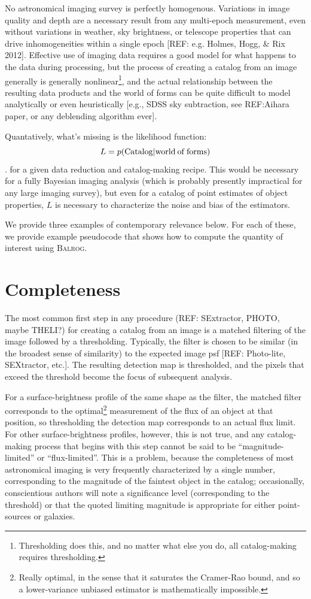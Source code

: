 \documentclass[12pt]{book}
\newcommand{\balrog}{\textsc{Balrog}}
\begin{document}
No astronomical imaging survey is perfectly homogenous. Variations in
image quality and depth are a necessary result from any multi-epoch
measurement, even without variations in weather, sky brightness, or
telescope properties that can drive inhomogeneities within a single
epoch [REF: e.g. Holmes, Hogg, \& Rix 2012]. Effective use of imaging
data requires a good model for what happens to the data during
processing, but the process of creating a catalog from an image
generally is generally nonlinear\footnote{Thresholding does this, and
  no matter what else you do, all catalog-making requires
  thresholding.}, and the actual relationship between the resulting
data products and the world of forms can be quite difficult to model
analytically or even heuristically [e.g., SDSS sky subtraction, see
REF:Aihara paper, or any deblending algorithm ever].

Quantatively, what's missing is the likelihood function:
\begin{equation}
L = p( {\rm Catalog} | {\rm world\: of\: forms})
\end{equation}.
for a given data reduction and catalog-making recipe. This would be
necessary for a fully Bayesian imaging analysis (which is probably presently impractical
for any large imaging survey), but even for a catalog of
point estimates of object properties, $L$ is necessary to characterize
the noise and bias of the estimators.

We provide three examples of contemporary relevance below. For each of
these, we provide example pseudocode that shows how to compute the
quantity of interest using \balrog{}.

\section{Completeness}
The most common first step in any procedure (REF: SExtractor, PHOTO, maybe THELI?) for
creating a catalog from an image is a matched filtering of the image
followed by a thresholding. Typically, the filter is chosen to be
similar (in the broadest sense of similarity) to the expected image
psf [REF: Photo-lite, SEXtractor, etc.]. The resulting detection map
is thresholded, and the pixels that exceed the threshold become the
focus of subsequent analysis.

For a surface-brightness profile of the same shape as the filter, the
matched filter corresponds to the optimal\footnote{Really optimal, in
  the sense that it saturates the Cramer-Rao bound, and so a
  lower-variance unbiased estimator is mathematically impossible.}
measurement of the flux of an object at that position, so thresholding
the detection map corresponds to an actual flux limit. For other
surface-brightness profiles, however, this is not true, and any
catalog-making process that begins with this step cannot be said to be
``magnitude-limited'' or ``flux-limited''. This is a problem, because
the completeness of most astronomical imaging is very frequently
characterized by a single number, corresponding to the magnitude of
the faintest object in the catalog; occasionally, conscientious
authors will note a significance level (corresponding to the
threshold) or that the quoted limiting magnitude is appropriate
for either point-sources or galaxies. 
\end{document}
